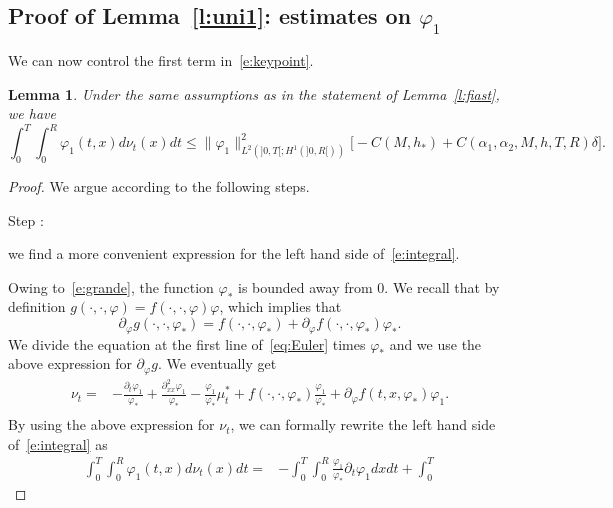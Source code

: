 \documentclass[11pt,leqno]{amsart}
\newcounter{stepnb}
\newtheorem{lemma}[theorem]{Lemma}
\numberwithin{equation}{section}
\begin{document}
\subsection{Proof of Lemma~\ref{l:uni1}: estimates on ${\varphi}_1$}
\label{ss:fhiuno}
We can now control the first term in~\eqref{e:keypoint}. 
\begin{lemma}
\label{le:6.3}
  Under the same assumptions as in the statement of Lemma~\ref{l:fiast}, we have 
\begin{equation}
\label{e:integral}
          \int_0^T  \! \! \int_0^R {\varphi}_1(t,x) d\nu_t(x)dt 
\leq  \| {\varphi}_1 \|^2_{L^2 (  ]0, T[; H^1 (]0, R[))} 
\Big[ 
- C(M, h_\ast) +  C(\alpha_1, \alpha_2, M, h, T, R)  \delta
\Big].
\end{equation}
\end{lemma}
\begin{proof}
We argue according to the following steps. \\
{\setcounter{stepnb}{0}}
{{{\sc \addtocounter{stepnb}{1}\noindent  Step :} {we find a more convenient expression for the left hand side
  of~\eqref{e:integral}}.}}
Owing to~\eqref{e:grande}, the function ${\varphi}_\ast$ is bounded away from $0$. We recall that by definition $g(\cdot, \cdot, {\varphi}) = f(\cdot, \cdot, {\varphi}){\varphi}$, 
which implies that 
$$
    \partial_{\varphi} g (\cdot, \cdot, {\varphi}_\ast) =
    f(\cdot, \cdot, {\varphi}_\ast) + \partial_{\varphi} f(\cdot, \cdot, {\varphi}_\ast ){\varphi}_\ast.  
$$
We divide  the equation at the first line of~\eqref{eq:Euler} times ${\varphi}_\ast$ and we use  the above expression for $\partial_{\varphi} g$. We eventually get
\begin{equation*}
\label{eq:4.2.3}
\begin{split}
\nu_t=&-\frac{{\partial_t}{\varphi}_1}{{\varphi}_\ast}+\frac{{\partial_{xx}^2}{\varphi}_1}{{\varphi}_\ast}-\frac{{\varphi}_1}{{\varphi}_\ast}\mu^\ast_t+
f(\cdot,\cdot,{\varphi}_\ast)\frac{{\varphi}_1}{{\varphi}_\ast}+{\partial}_{\varphi} f(t,x,{\varphi}_\ast){\varphi}_1. \\
\end{split}
\end{equation*} 
By using the above expression for $\nu_t$, we can formally rewrite
the left hand side of~\eqref{e:integral} as  
\begin{equation}
  \label{e:integrake}
  \begin{split}
    \int_0^T \! \int_0^R\! {\varphi}_1(t,x) d\nu_t(x)dt = & - \int_0^T \!
    \int_0^R \!\frac{{\varphi}_1 }{{\varphi}_\ast} {\partial_t}{\varphi}_1 dx dt + \int_0^T \!

\end{split}
\end{equation}
\end{proof}
\end{document}
